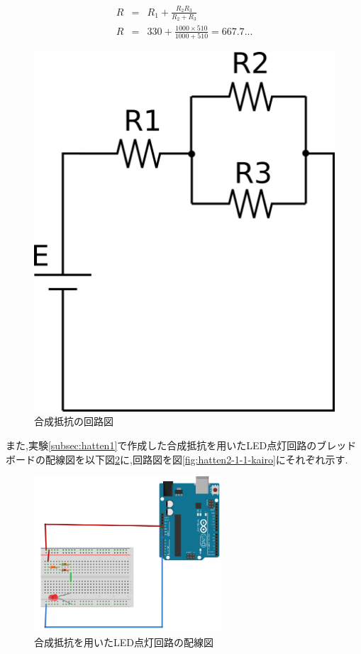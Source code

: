 \documentclass{jarticle}
\begin{document}
\begin{eqnarray}
R&=&R_1+\frac{R_2R_3}{R_2+R_3} \nonumber \\
R&=&330+\frac{1000\times510}{1000+510}=667.7...
\label{eq:gouseihatten}
\end{eqnarray}

\begin{figure}[H]
\begin{center}
\includegraphics[scale=0.4]{images/合成抵抗.png}
\caption{合成抵抗の回路図}
\label{fig:gouseihatten}
\end{center}
\end{figure}

また,実験\ref{subsec:hatten1}で作成した合成抵抗を用いたLED点灯回路のブレッドボードの配線図を以下図\ref{fig:hatten2-1-1-bread}に,回路図を図\ref{fig:hatten2-1-1-kairo}にそれぞれ示す.

\begin{figure}[H]
\begin{center}
\includegraphics[width=7.0cm]{images/hatten2-1-1_ブレッドボード.png}
\caption{合成抵抗を用いたLED点灯回路の配線図}
\label{fig:hatten2-1-1-bread}
\end{center}
\end{figure}
\end{document}

